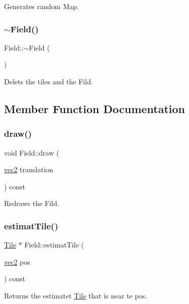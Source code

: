 Generates random Map. \mbox{\label{classField_a45d6e6d09b8f8e46de62b40119d62c60}} 
\subsubsection{\texorpdfstring{$\sim$\+Field()}{~Field()}}
{\footnotesize\ttfamily Field\+::$\sim$\+Field (\begin{DoxyParamCaption}{ }\end{DoxyParamCaption})}

Delets the tiles and the Fild. 

\subsection{Member Function Documentation}
\mbox{\label{classField_a6ba5bccf334f6022710acb5a4bbe5e09}} 
\subsubsection{\texorpdfstring{draw()}{draw()}}
{\footnotesize\ttfamily void Field\+::draw (\begin{DoxyParamCaption}\item[{\hyperlink{structvec2}{vec2}}]{translation }\end{DoxyParamCaption}) const}

Redraws the Fild. \mbox{\label{classField_a8068a7e61bc891b1e4cf7d4d9d7afd12}} 
\subsubsection{\texorpdfstring{estimat\+Tile()}{estimatTile()}}
{\footnotesize\ttfamily \hyperlink{classTile}{Tile} $\ast$ Field\+::estimat\+Tile (\begin{DoxyParamCaption}\item[{\hyperlink{structvec2}{vec2}}]{pos }\end{DoxyParamCaption}) const}

\begin{DoxyReturn}{Returns}
the estimatet \hyperlink{classTile}{Tile} that is near te pos. 
\end{DoxyReturn}
\mbox{\label{classField_a0e5a676ab734632e575513491f049330}} 
